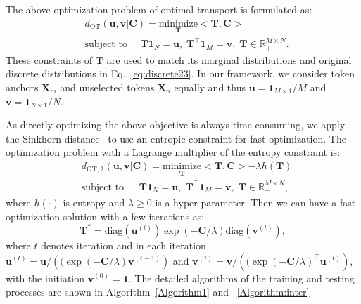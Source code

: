 The above optimization problem of optimal transport is formulated as:
\begin{equation} 
\label{eq:optimization2}
    \begin{aligned}
    & d_{\text{OT}}(\bm{u},\bm{v}|\bm{C}) = \underset{\bm{T}}{\text{minimize}}
     <\bm{T},\bm{C}> \\
    & \text{subject to}
    ~~~~~~\bm{T}\bm{1}_N = \bm{u},\; \bm{T}^\top \bm{1}_M = \bm{v},\; \bm{T} \in \mathbb{R}^{M \times N}_+.
    \end{aligned}
\end{equation}
These constraints of $\bm{T}$ are used to match its marginal distributions and original discrete distributions in Eq.~\ref{eq:discrete23}. In our framework, we 
consider token anchors $\bm{X}_m$ and unselected tokens $\bm{X}_n$ equally and thus $\bm{u} = \bm{1}_{M\times 1}/M$ and $\bm{v} = \bm{1}_{N\times 1}/N$.



As directly optimizing the above objective is always time-consuming, we apply the Sinkhorn distance~\citep{cuturi2013sinkhorn} to use an entropic constraint for fast optimization.
The optimization problem with a Lagrange multiplier of the entropy constraint is:
\begin{equation} \label{eq:Sinkhorn-app-1}
\begin{aligned}
& d_{\text{OT},\lambda}(\bm{u},\bm{v}|\bm{C})=\underset{\bm{T}}{\text{minimize}}
 <\bm{T},\bm{C}> - \lambda h(\bm{T})\\
& \text{subject to}
~~~~~~~\bm{T}\bm{1}_N = \bm{u},\; \bm{T}^\top \bm{1}_M = \bm{v},\; \bm{T} \in \mathbb{R}^{M \times N}_+,
\end{aligned}
\end{equation}
where $h(\cdot) $ is entropy and $\lambda \geq 0$ is a hyper-parameter. Then we can have a fast optimization solution with a few iterations as:
\begin{equation} \label{eq:Sinkhorn-app-2}
\bm{T}^*= \text{diag}(\bm{u}^{(t)}) \exp(-\bm{C}/\lambda) \text{diag}(\bm{v}^{(t)}),
\end{equation}
where $t$ denotes iteration and in each iteration 
$\bm{u}^{(t)} =\bm{u}/\left((\exp(-\bm{C}/\lambda)\bm{v}^{(t-1)}\right) $ and  $\bm{v}^{(t)} =\bm{v}/\left((\exp(-\bm{C}/\lambda)^\top\bm{u}^{(t)}\right) $, with the initiation $\bm{v}^{(0)} = \bm{1} $. The detailed algorithms of the training and testing processes are shown in Algorithm~\ref{Algorithm1} and ~\ref{Algorithm:inter}


